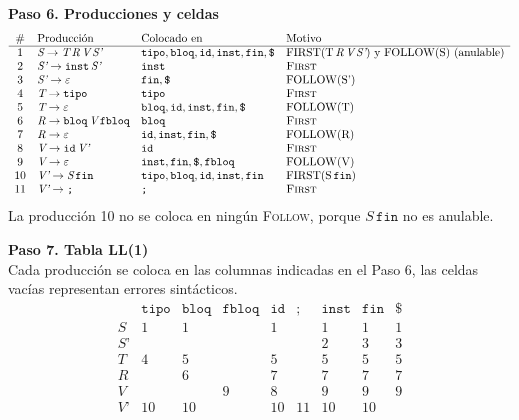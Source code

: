 \documentclass[12pt,letterpaper]{article}
\newcommand{\nt}[1]{\textit{#1}}
\newcommand{\tk}[1]{\texttt{#1}}
\newcommand{\tx}[1]{\text{#1}}
\newcommand{\First}[1]{\mathrm{FIRST}(#1)}
\newcommand{\Follow}[1]{\mathrm{FOLLOW}(#1)}
\newcommand{\eps}{\varepsilon}
\begin{document}
\begin{enumerate}[label=\arabic*.]
\begin{itemize}
    \textbf{Paso 6. Producciones y celdas}
    \[
    \begin{array}{c l l l}
      \# & \text{Producción} & \text{Colocado en} & \text{Motivo} \\ \hline
      1  & \nt{S}\to\nt{T}\,\nt{R}\,\nt{V}\,\nt{S'} & \tk{tipo},\tk{bloq},\tk{id},\tk{inst},\tk{fin},\tk{\$} & \First{\tx{T}\,\nt{R}\,\nt{V}\,\nt{S'}}\text{ y }\Follow{\tx{S}}\ \text{(anulable)} \\
      2  & \nt{S'}\to\tk{inst}\,\nt{S'} & \tk{inst} & \text{\textsc{First}} \\
      3  & \nt{S'}\to\eps & \tk{fin},\tk{\$} & \Follow{\tx{S'}} \\
      4  & \nt{T}\to\tk{tipo} & \tk{tipo} & \text{\textsc{First}} \\
      5  & \nt{T}\to\eps & \tk{bloq},\tk{id},\tk{inst},\tk{fin},\tk{\$} & \Follow{\tx{T}} \\
      6  & \nt{R}\to\tk{bloq}\,\nt{V}\,\tk{fbloq} & \tk{bloq} & \text{\textsc{First}} \\
      7  & \nt{R}\to\eps & \tk{id},\tk{inst},\tk{fin},\tk{\$} & \Follow{\tx{R}} \\
      8  & \nt{V}\to\tk{id}\,\nt{V'} & \tk{id} & \text{\textsc{First}} \\
      9  & \nt{V}\to\eps & \tk{inst},\tk{fin},\tk{\$},\tk{fbloq} & \Follow{\tx{V}} \\
      10 & \nt{V'}\to\nt{S}\,\tk{fin} & \tk{tipo},\tk{bloq},\tk{id},\tk{inst},\tk{fin} & \First{\tx{S}\,\tk{fin}} \\
      11 & \nt{V'}\to\tk{;} & \tk{;} & \text{\textsc{First}}
    \end{array}
    \]
    La producción 10 no se coloca en ningún \textsc{Follow}, porque $\nt{S}\,\tk{fin}$ no es anulable.

    \bigskip

    \textbf{Paso 7. Tabla LL(1)}\\
    Cada producción se coloca en las columnas indicadas en el Paso 6, las celdas vacías representan errores
    sintácticos.
    \[
    \begin{array}{c|c|c|c|c|c|c|c|c}
      & \tk{tipo} & \tk{bloq} & \tk{fbloq} & \tk{id} & \tk{;} & \tk{inst} & \tk{fin} & \tk{\$} \\ \hline
      \nt{S}  & 1  & 1  &   & 1 &    & 1  & 1  & 1 \\ \hline
      \nt{S'} &    &    &   &   &    & 2  & 3  & 3 \\ \hline
      \nt{T}  & 4  & 5  &   & 5 &    & 5  & 5  & 5 \\ \hline
      \nt{R}  &    & 6  &   & 7 &    & 7  & 7  & 7 \\ \hline
      \nt{V}  &    &    & 9 & 8 &    & 9  & 9  & 9 \\ \hline
      \nt{V'} & 10 & 10 &   & 10 & 11 & 10 & 10 &
    \end{array}
    \]


\end{itemize}
\end{enumerate}
\end{document}
